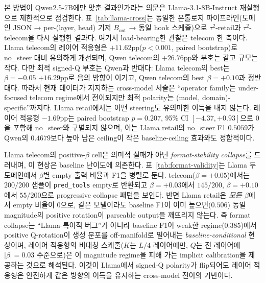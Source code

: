 본 방법이 Qwen2.5-7B에만 맞춘 결과인가라는 의문은 Llama-3.1-8B-Instruct 재실행으로 제한적으로 점검한다. 표~\ref{tab:llama-cross}는 동일한 온톨로지 파이프라인(도메인 JSON → per-(layer, head) 기저 $B_{\mathrm{ont}}$ → 동일 hook 스케줄)으로 $\tau^2$-retail과 $\tau^2$-telecom을 다시 실행한 결과다. 여기서 load-bearing한 관찰은 telecom 한 축이다. Llama telecom의 레이어 적응형은 $+11.62$pp($p<0.001$, paired bootstrap)로 no\_steer 대비 유의하게 개선되며, Qwen telecom의 $+26.76$pp와 부호는 같고 규모는 작다. 다만 최적 signed-Q 부호는 Qwen과 반대다: Llama telecom의 best는 $\beta{=}{-}0.05$ $+16.29$pp로 음의 방향이 이기고, Qwen telecom의 best $\beta{=}{+}0.10$과 정반대다. 따라서 현재 데이터가 지지하는 cross-model 서술은 ``operator family는 under-focused telecom regime에서 전이되지만 최적 polarity는 (model, domain)-specific''까지다. Llama retail에서는 어떤 steering도 유의미한 이득을 내지 않는다. 레이어 적응형 $-1.69$pp는 paired bootstrap $p=0.207$, 95\% CI $[-4.37, +0.93]$으로 0을 포함해 no\_steer와 구별되지 않으며, 이는 Llama retail의 no\_steer F1 $0.5059$가 Qwen의 $0.4679$보다 높아 남은 ceiling이 작은 baseline-ceiling 효과와도 정합적이다.

Llama telecom의 positive-$\beta$ cell은 의미적 실패가 아닌 \emph{format-stability collapse}를 드러내며, 이 현상은 baseline 난이도에 의존한다. 표~\ref{tab:format-validity}는 Llama 두 도메인에서 $\beta$별 empty 출력 비율과 F1을 병렬로 둔다. telecom($\beta{=}{+}0.05$)에서는 $200/200$ 샘플이 \texttt{pred\_tools} empty로 반환되고 $\beta{=}{+}0.03$에서 $145/200$, $\beta{=}{+}0.10$에서 $55/200$으로 progressive collapse 패턴을 보인다. 반면 Llama retail은 \emph{모든 $\beta$}에서 empty 비율이 0으로, 같은 모델이라도 baseline F1이 이미 높으면($0.506$) 동일 magnitude의 positive rotation이 parseable output을 깨뜨리지 않는다. 즉 format collapse는 ``Llama-특이적 버그''가 아니라 baseline F1이 weak한 regime($0.385$)에서 positive Q-rotation이 생성 분포를 off-manifold로 밀어내는 \emph{baseline-conditional} 현상이며, 레이어 적응형의 비대칭 스케줄($K$는 $L/4$ 레이어에만, $Q$는 전 레이어에 $|\beta|=0.03$ 수준으로)은 이 magnitude regime을 피해 가는 implicit calibration을 제공하는 것으로 해석된다. 이것이 Llama에서 signed-Q polarity가 flip되어도 레이어 적응형은 안전하게 같은 방향의 이득을 유지하는 cross-model 전이의 기반이다.

